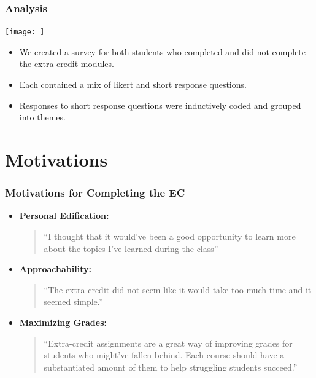 \documentclass{beamer}
\begin{document}
\begin{frame}
    \frametitle{Analysis}

    \begin{minipage}{0.45\textwidth}
      \texttt{[image: ]}
    \end{minipage}
    \begin{minipage}{0.45\textwidth}
      \begin{itemize}
        \item We created a survey for both students who completed and did not complete the extra credit modules. 
        \item Each contained a mix of likert and short response questions.
        \item Responses to short response questions were inductively coded and grouped into themes.
      \end{itemize}
    \end{minipage}
    

\end{frame}

\section{Motivations}


\begin{frame}[fragile]
    \frametitle{Motivations for Completing the EC}

    \begin{itemize}
      \item \textbf{Personal Edification:}\\
        \begin{quote}
          ``I thought that it would've been a good opportunity to learn more about
          the topics I've learned during the class''
        \end{quote}
      \item \textbf{Approachability:}\\
        \begin{quote}
          ``The extra credit did not seem like it would take too much time and it seemed simple.''
        \end{quote}
      \item \textbf{Maximizing Grades:}\\
        \begin{quote}
          ``Extra-credit assignments are a great way of improving grades for
          students who might've fallen behind. Each course should have a
          substantiated amount of them to help struggling students succeed.''
        \end{quote}
    \end{itemize}

\end{frame}
\end{document}
